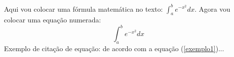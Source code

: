 Aqui vou colocar uma fórmula matemática no texto: $\int_a^b e^{-x^{2}}dx$.
Agora vou colocar uma equação numerada:
\begin{equation}
\int_a^b e^{-x^{2}}dx
\label{exemplo1}
\end{equation}
Exemplo de citação de equação: de acordo com a equação (\ref{exemplo1})...